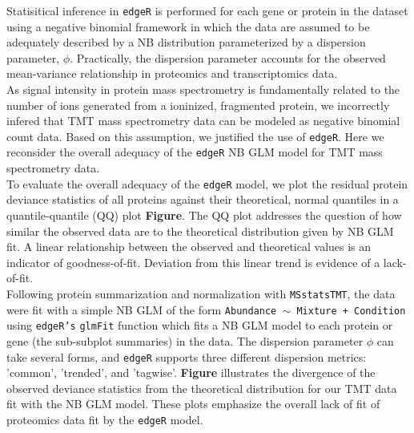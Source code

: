\documentclass[11pt]{elife}\usepackage[]{graphicx}\usepackage[]{color}
\begin{document}
Statisitical inference in \texttt{edgeR} is performed for each gene or protein in
the dataset using a negative binomial framework in which the data are assumed to 
be adequately described by a NB distribution parameterized by a dispersion 
parameter, $\phi$. Practically, the dispersion parameter accounts for the
observed mean-variance relationship in proteomics and transcriptomics data.\\


As signal intensity in protein mass spectrometry is fundamentally related to the
number of ions generated from a ioninized, fragmented protein, we incorrectly
infered that TMT mass spectrometry data can be modeled as negative binomial
count data. Based on this assumption, we justified the use of \texttt{edgeR}.
Here we reconsider the overall adequacy of the \texttt{edgeR} NB GLM model for
TMT mass spectrometry data.\\

To evaluate the overall adequacy of the \texttt{edgeR} model, we plot the 
residual protein deviance statistics of all proteins against their theoretical, 
normal quantiles in a quantile-quantile (QQ) plot \textbf{Figure}.
The QQ plot addresses the question of how similar the observed data are to the
theoretical distribution given by NB GLM fit. A linear relationship between the
observed and theoretical values is an indicator of goodness-of-fit.
Deviation from this linear trend is evidence of a lack-of-fit.\\

Following protein summarization and normalization with \texttt{MSstatsTMT}, 
the data were fit with a simple NB GLM of the form 
\texttt{Abundance $\sim$ Mixture + Condition} using \texttt{edgeR's} 
\texttt{glmFit} function which fits a NB GLM model to each
protein or gene (the sub-subplot summaries) in the data. The dispersion
parameter $\phi$ can take several forms, and \texttt{edgeR} supports three 
different dispersion metrics: 'common', 'trended', and 'tagwise'. 
\textbf{Figure} illustrates the divergence of the observed deviance statistics 
from the theoretical distribution for our TMT data fit with the NB GLM model. 
These plots emphasize the overall lack of fit of proteomics data 
fit by the \texttt{edgeR} model.\\ 
\end{document}
